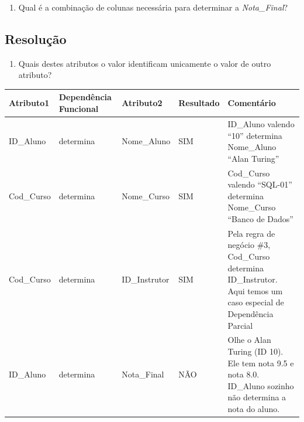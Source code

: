 \documentclass[
]{book}
\providecommand{\tightlist}{%
  \setlength{\itemsep}{0pt}\setlength{\parskip}{0pt}}
\begin{document}
\begin{enumerate}
\def\labelenumi{\arabic{enumi})}
\setcounter{enumi}{1}
\tightlist
\item
  Qual é a combinação de colunas necessária para determinar a \emph{Nota\_Final}?
\end{enumerate}

\subsection{Resolução}\label{resoluuxe7uxe3o-1}

\begin{enumerate}
\def\labelenumi{\arabic{enumi})}
\tightlist
\item
  Quais destes atributos o valor identificam unicamente o valor de outro atributo?
\end{enumerate}

\begin{longtable}[]{@{}
  >{\centering\arraybackslash}p{}
  >{\centering\arraybackslash}p{}
  >{\centering\arraybackslash}p{}
  >{\centering\arraybackslash}p{}
  >{\raggedright\arraybackslash}p{}@{}}
\toprule\noalign{}
\begin{minipage}[b]{\linewidth}\centering
Atributo1
\end{minipage} & \begin{minipage}[b]{\linewidth}\centering
Dependência Funcional
\end{minipage} & \begin{minipage}[b]{\linewidth}\centering
Atributo2
\end{minipage} & \begin{minipage}[b]{\linewidth}\centering
Resultado
\end{minipage} & \begin{minipage}[b]{\linewidth}\raggedright
Comentário
\end{minipage} \\
\midrule\noalign{}
\endhead
\bottomrule\noalign{}
\endlastfoot
ID\_Aluno & determina & Nome\_Aluno & SIM & ID\_Aluno valendo ``10'' determina Nome\_Aluno ``Alan Turing'' \\
Cod\_Curso & determina & Nome\_Curso & SIM & Cod\_Curso valendo ``SQL-01'' determina Nome\_Curso ``Banco de Dados'' \\
Cod\_Curso & determina & ID\_Instrutor & SIM & Pela regra de negócio \#3, Cod\_Curso determina ID\_Instrutor. Aqui temos um caso especial de Dependência Parcial \\
ID\_Aluno & determina & Nota\_Final & NÃO & Olhe o Alan Turing (ID 10). Ele tem nota 9.5 e nota 8.0. ID\_Aluno sozinho não determina a nota do aluno. \\
\end{longtable}
\end{document}
